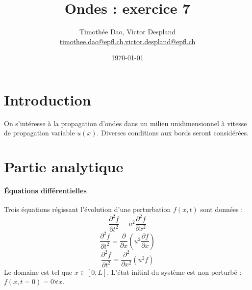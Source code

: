 \documentclass[a4paper,12pt,oneside]{article}
\def \be {\begin{equation}}
\def \ee {\end{equation}}
\newcommand{\mail}[1]{{\href{mailto:#1}{#1}}}
\begin{document}
\pagestyle{empty}

\title{Ondes : exercice 7}
\date{\today}
\author{Timothée Dao, Victor Despland\\{\small \mail{timothee.dao@epfl.ch},\mail{victor.despland@epfl.ch}}}
\maketitle
\thispagestyle{empty} %
 

\clearpage
\tableofcontents




\newpage 
\setcounter{page}{1}
\pagestyle{plain}

\section{Introduction}
On s'intéresse à la propagation d'ondes dans un milieu unidimensionnel à vitesse de propagation variable $u(x)$. Diverses conditions aux bords seront considérées.



\section{Partie analytique}
\paragraph{Équations différentielles}
Trois équations régissant l'évolution d'une perturbation $f(x,t)$ sont données :
\be \frac{\partial^2 f}{\partial t^2}= u^2\frac{\partial^2 f}{\partial x^2} \label{eq:Alem} \ee
\be \frac{\partial^2 f}{\partial t^2}= \frac{\partial}{\partial x}\left(u^2\frac{\partial f}{\partial x} \right)\ee
\be \frac{\partial^2 f}{\partial t^2}= \frac{\partial^2}{\partial x^2}\left( u^2f\right) \ee
Le domaine est tel que $x \in [0,L]$. L'état initial du système est non perturbé : $f(x,t=0)=0 \forall x$.

\end{document}
